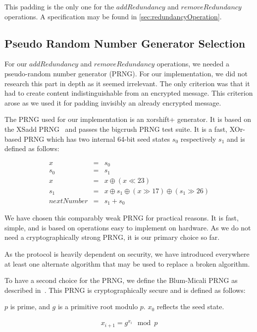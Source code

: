 This padding is the only one for the $addRedundancy$ and $removeRedundancy$ operations. A specification may be found in \cref{sec:redundancyOperation}.

\subsection{Pseudo Random Number Generator Selection}\label{sec:prng}
For our $addRedundancy$ and $removeRedundancy$ operations, we needed a pseudo-random number generator (PRNG). For our implementation, we did not research this part in depth as it seemed irrelevant. The only criterion was that it had to create content indistinguishable from an encrypted message. This criterion arose as we used it for padding invisibly an already encrypted message.

The PRNG used for our implementation is an xorshift+ generator. It is based on the XSadd PRNG~\cite{marsaglia2003xorshift} and passes the bigcrush PRNG test suite. It is a fast, XOr-based PRNG which has two internal 64-bit seed states $s_0$ respectively $s_1$ and is defined as follows:

\begin{eqnarray}
	x & = & s_0\\
	s_0 & = & s_1\\
	x & = & x \oplus ( x \ll 23 )\\
	s_1 & = & x \oplus s_1 \oplus ( x \gg 17 ) \oplus (s_1 \gg 26 )\\
	nextNumber & = & s_1+s_0
\end{eqnarray}

We have chosen this comparably weak PRNG for practical reasons. It is fast, simple, and is based on operations easy to implement on hardware. As we do not need a cryptographically strong PRNG, it is our primary choice so far. 

As the protocol is heavily dependent on security, we have introduced everywhere at least one alternate algorithm that may be used to replace a broken algorithm. 

To have a second choice for the PRNG, we define the Blum-Micali PRNG as described in~\cite{blum1984generate}. This PRNG is cryptographically secure and is defined as follows:

$p$ is prime, and $g$ is a primitive root modulo $p$. $x_0$ reflects the seed state.

\begin{eqnarray}
	x_{i+1}=g^{x_i}\mod p
\end{eqnarray}

